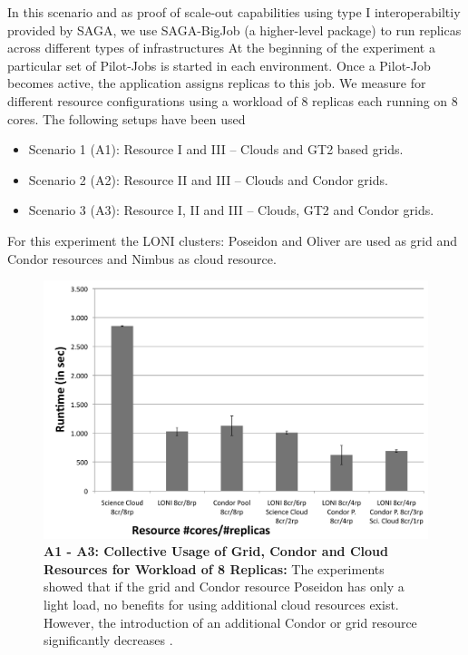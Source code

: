 \documentclass[graybox]{svmult}
\begin{document}
In this scenario and as proof of scale-out capabilities using type I
interoperabiltiy provided by SAGA, we use SAGA-BigJob (a higher-level
package) to run replicas across different types of infrastructures
At the beginning of the experiment a particular set of Pilot-Jobs is
started in each environment. Once a Pilot-Job becomes active, the
application assigns replicas to this job.  We measure \tc for different
resource configurations using a workload of 8 replicas each running on
8 cores. The following setups have been used
\begin{itemize}
\item Scenario 1 (A1): Resource I and III -- Clouds and GT2 based grids. 
\item Scenario 2 (A2): Resource II and III -- Clouds and Condor grids.
\item Scenario 3 (A3): Resource I, II and III -- Clouds, GT2 and Condor grids.
\end{itemize} 
For this experiment the LONI clusters: Poseidon and Oliver are used as
grid and Condor resources and Nimbus as cloud resource.

\begin{figure}[tbp]
    \centering
        \includegraphics[width=1.0\textwidth]{figures/8replica_scenario_grid_condor_cloud}
        \caption{
          \footnotesize
          \label{fig:performance_8replica_grid_cloud_condor}
          \textbf{A1 - A3: Collective Usage of Grid, Condor and
          Cloud Resources for Workload of 8 Replicas: } The experiments showed 
          that if the grid and Condor resource Poseidon has only a light load, 
          no benefits for using additional cloud resources exist. However, the 
          introduction of an additional Condor or grid resource significantly 
          decreases \tc.}
\end{figure}
\end{document}
